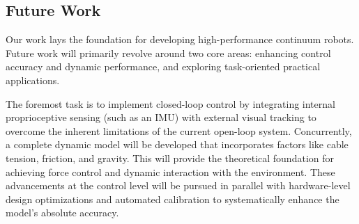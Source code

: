 \documentclass[conference]{IEEEtran}
\begin{document}
\subsection{Future Work}

Our work lays the foundation for developing high-performance continuum robots. Future work will primarily revolve around two core areas: enhancing control accuracy and dynamic performance, and exploring task-oriented practical applications.

The foremost task is to implement closed-loop control by integrating internal proprioceptive sensing (such as an IMU) with external visual tracking to overcome the inherent limitations of the current open-loop system. Concurrently, a complete dynamic model will be developed that incorporates factors like cable tension, friction, and gravity. This will provide the theoretical foundation for achieving force control and dynamic interaction with the environment. These advancements at the control level will be pursued in parallel with hardware-level design optimizations and automated calibration to systematically enhance the model's absolute accuracy.
\end{document}
